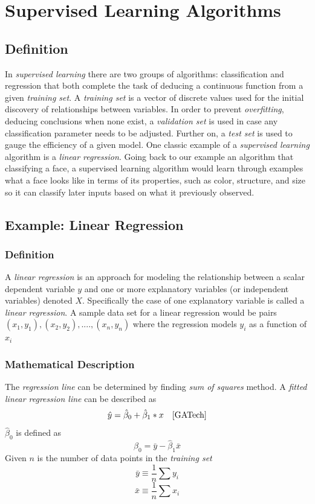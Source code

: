 \documentclass[12pt]{article}
\begin{document}
\section{Supervised Learning Algorithms}
\subsection{Definition}
In \textit{supervised learning} there are two groups of algorithms: classification and regression that both complete the task of deducing a continuous function from a given \textit{training set}. \cite{Ng} A \textit{training set} is a vector of discrete values used for the initial discovery of relationships between variables. In order to prevent \textit{overfitting}, deducing conclusions when none exist, a \textit{validation set} is used in case any classification parameter needs to be adjusted. Further on, a \textit{test set} is used to gauge the efficiency of a given model. \cite{Ng} One classic example of a \textit{supervised learning} algorithm is a \textit{linear regression}. Going back to our example an algorithm that classifying a face, a supervised learning algorithm would learn through examples what a face looks like in terms of its properties, such as color, structure, and size so it can classify later inputs based on what it previously observed.
\subsection{Example: Linear Regression}
\subsubsection{Definition}
A \textit{linear regression} is an approach for modeling the relationship between a scalar dependent variable $y$ and one or more explanatory variables (or independent variables) denoted $X$. Specifically the case of one explanatory variable is called a \textit{linear regression}. A sample data set for a linear regression would be pairs $(x_1,y_1),(x_2,y_2),....,(x_n,y_n)$ where the regression models $y_i$ as a function of $x_i$
\subsubsection{Mathematical Description}
The \textit{regression line} can be determined by finding \textit{sum of squares} method. A
\textit{fitted linear regression line} can be described as
\begin{equation}
\hat y=\hat \beta_{0}+\hat \beta_1*x \, \, \, \, \, \,\cite{GATech}
\end{equation}
$\hat \beta_0$ is defined as 
\begin{equation}
	\hat \beta_0 = \bar y - \hat \beta_1 \bar x
\end{equation}
Given $n$ is the number of data points in the \textit{training set}\\
\begin{equation}
	\bar y \equiv \frac{1}{n} \sum y_i
\end{equation}
\begin{equation}
	\bar x \equiv \frac{1}{n}\sum x_i	
\end{equation}
\end{document}
